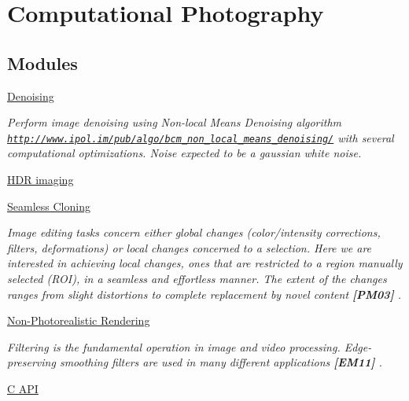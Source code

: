 \hypertarget{group__photo}{}\section{Computational Photography}
\label{group__photo}
\subsection*{Modules}
\begin{DoxyCompactItemize}
\item 
\hyperlink{group__photo__denoise}{Denoising}
\begin{DoxyCompactList}\small\item\em Perform image denoising using Non-\/local Means Denoising algorithm \href{http://www.ipol.im/pub/algo/bcm_non_local_means_denoising/}{\tt http\+://www.\+ipol.\+im/pub/algo/bcm\+\_\+non\+\_\+local\+\_\+means\+\_\+denoising/} with several computational optimizations. Noise expected to be a gaussian white noise. \end{DoxyCompactList}\item 
\hyperlink{group__photo__hdr}{H\+D\+R imaging}
\item 
\hyperlink{group__photo__clone}{Seamless Cloning}
\begin{DoxyCompactList}\small\item\em Image editing tasks concern either global changes (color/intensity corrections, filters, deformations) or local changes concerned to a selection. Here we are interested in achieving local changes, ones that are restricted to a region manually selected (R\+OI), in a seamless and effortless manner. The extent of the changes ranges from slight distortions to complete replacement by novel content {\bfseries [P\+M03]} . \end{DoxyCompactList}\item 
\hyperlink{group__photo__render}{Non-\/\+Photorealistic Rendering}
\begin{DoxyCompactList}\small\item\em Filtering is the fundamental operation in image and video processing. Edge-\/preserving smoothing filters are used in many different applications {\bfseries [E\+M11]} . \end{DoxyCompactList}\item 
\hyperlink{group__photo__c}{C A\+PI}
\end{DoxyCompactItemize}
